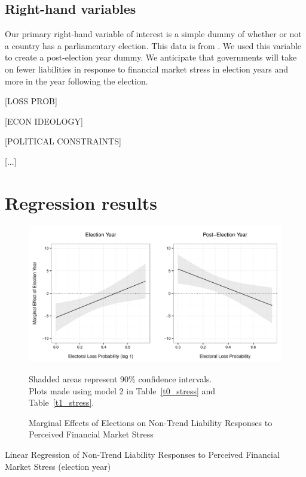 \documentclass[]{article}
\begin{document}
\subsection*{Right-hand variables}

Our primary right-hand variable of interest is a simple dummy of whether or not a country has a parliamentary election. This data is from \cite{Kayser2015comp}. We used this variable to create a post-election year dummy. We anticipate that governments will take on fewer liabilities in response to financial market stress in election years and more in the year following the election.

[LOSS PROB]

[ECON IDEOLOGY]

[POLITICAL CONSTRAINTS]

[...]

\section{Regression results}

\begin{figure}
    \caption{Marginal Effects of Elections on Non-Trend Liability Responses to Perceived Financial Market Stress}
    \label{me_liab_stress}

    \begin{center}
        \includegraphics[scale=0.7]{analysis/figures/me_liab_stress.pdf}
    \end{center}

    {\scriptsize{Shadded areas represent 90\% confidence intervals. \\
    Plots made using model 2 in Table~\ref{t0_stress} and Table~\ref{t1_stress}.}}

\end{figure}

\begin{table}
    \caption{Linear Regression of Non-Trend Liability Responses to Perceived Financial Market Stress (election year)}
    \label{t0_stress}

    \begin{center}
        
    \end{center}

\end{table}
\end{document}
